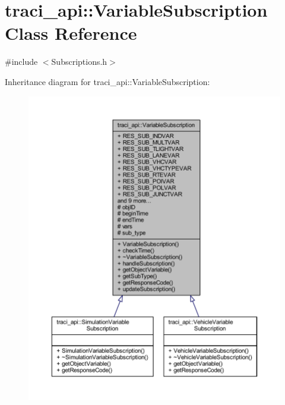 \hypertarget{classtraci__api_1_1_variable_subscription}{}\section{traci\+\_\+api\+:\+:Variable\+Subscription Class Reference}
\label{classtraci__api_1_1_variable_subscription}


{\ttfamily \#include $<$Subscriptions.\+h$>$}



Inheritance diagram for traci\+\_\+api\+:\+:Variable\+Subscription\+:
\nopagebreak
\begin{figure}[H]
\begin{center}
\leavevmode
\includegraphics[width=350pt]{classtraci__api_1_1_variable_subscription__inherit__graph}
\end{center}
\end{figure}


